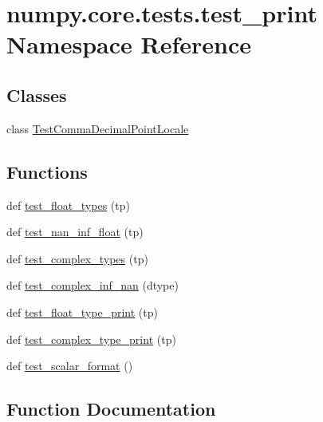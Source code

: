 \hypertarget{namespacenumpy_1_1core_1_1tests_1_1test__print}{}\section{numpy.\+core.\+tests.\+test\+\_\+print Namespace Reference}
\label{namespacenumpy_1_1core_1_1tests_1_1test__print}
\subsection*{Classes}
\begin{DoxyCompactItemize}
\item 
class \hyperlink{classnumpy_1_1core_1_1tests_1_1test__print_1_1TestCommaDecimalPointLocale}{Test\+Comma\+Decimal\+Point\+Locale}
\end{DoxyCompactItemize}
\subsection*{Functions}
\begin{DoxyCompactItemize}
\item 
def \hyperlink{namespacenumpy_1_1core_1_1tests_1_1test__print_a7aed6e1b1afacba7e397501aa8bcc7cf}{test\+\_\+float\+\_\+types} (tp)
\item 
def \hyperlink{namespacenumpy_1_1core_1_1tests_1_1test__print_a1db14b60951812cd3738b73fe472ccdf}{test\+\_\+nan\+\_\+inf\+\_\+float} (tp)
\item 
def \hyperlink{namespacenumpy_1_1core_1_1tests_1_1test__print_a7d5664bd54091db7245e09ea61e55f15}{test\+\_\+complex\+\_\+types} (tp)
\item 
def \hyperlink{namespacenumpy_1_1core_1_1tests_1_1test__print_ad9310d8efda15d097aca4a1443aea592}{test\+\_\+complex\+\_\+inf\+\_\+nan} (dtype)
\item 
def \hyperlink{namespacenumpy_1_1core_1_1tests_1_1test__print_a65ebe1218dec4df7365f23e83794baf5}{test\+\_\+float\+\_\+type\+\_\+print} (tp)
\item 
def \hyperlink{namespacenumpy_1_1core_1_1tests_1_1test__print_a34266596370ab0404c640f1c4981630d}{test\+\_\+complex\+\_\+type\+\_\+print} (tp)
\item 
def \hyperlink{namespacenumpy_1_1core_1_1tests_1_1test__print_aa204566ea8023a214404048a3edc4921}{test\+\_\+scalar\+\_\+format} ()
\end{DoxyCompactItemize}


\subsection{Function Documentation}
\mbox{\label{namespacenumpy_1_1core_1_1tests_1_1test__print_ad9310d8efda15d097aca4a1443aea592}} 
